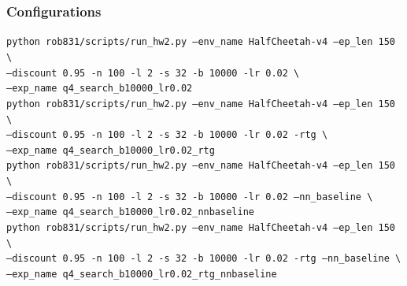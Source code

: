 \documentclass{article}
\begin{document}
\subsubsection{Configurations}
\begin{answer}[title=Q7.2.1,height=10cm,width=\linewidth]
\texttt{python rob831/scripts/run\_hw2.py --env\_name HalfCheetah-v4 --ep\_len 150 \textbackslash}
\\
\texttt{\hspace{1cm}--discount 0.95 -n 100 -l 2 -s 32 -b 10000 -lr 0.02 \textbackslash}
\\
\texttt{\hspace{1cm}--exp\_name q4\_search\_b10000\_lr0.02}
\\
\texttt{python rob831/scripts/run\_hw2.py --env\_name HalfCheetah-v4 --ep\_len 150 \textbackslash}
\\
\texttt{\hspace{1cm}--discount 0.95 -n 100 -l 2 -s 32 -b 10000 -lr 0.02 -rtg \textbackslash}
\\
\texttt{\hspace{1cm}--exp\_name q4\_search\_b10000\_lr0.02\_rtg}
\\
\texttt{python rob831/scripts/run\_hw2.py --env\_name HalfCheetah-v4 --ep\_len 150 \textbackslash}
\\
\texttt{\hspace{1cm}--discount 0.95 -n 100 -l 2 -s 32 -b 10000 -lr 0.02 --nn\_baseline \textbackslash}
\\
\texttt{\hspace{1cm}--exp\_name q4\_search\_b10000\_lr0.02\_nnbaseline}
\\
\texttt{python rob831/scripts/run\_hw2.py --env\_name HalfCheetah-v4 --ep\_len 150 \textbackslash}
\\
\texttt{\hspace{1cm}--discount 0.95 -n 100 -l 2 -s 32 -b 10000 -lr 0.02 -rtg --nn\_baseline \textbackslash}
\\
\texttt{\hspace{1cm}--exp\_name q4\_search\_b10000\_lr0.02\_rtg\_nnbaseline}

\end{answer}
\end{document}
